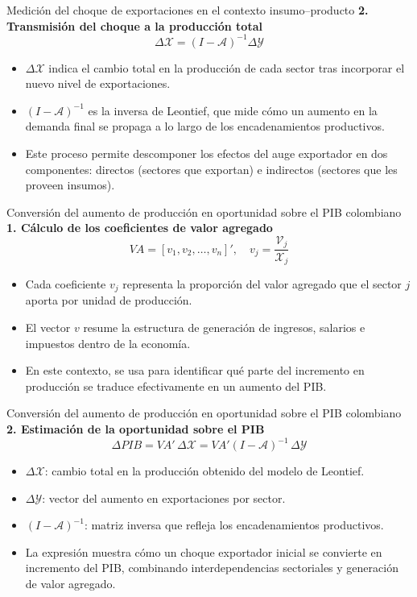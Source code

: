 \documentclass[aspectratio=169,xcolor=dvipsnames]{beamer}
\begin{document}
\begin{frame}{Medición del choque de exportaciones en el contexto insumo–producto}
    \textbf{2. Transmisión del choque a la producción total}
    \[
        \Delta \mathcal{X} = (I - \mathcal{A})^{-1} \Delta \mathcal{Y}
    \]
    \begin{itemize}
        \item $\Delta \mathcal{X}$ indica el cambio total en la producción de cada sector tras incorporar el nuevo nivel de exportaciones.
        \item $(I - \mathcal{A})^{-1}$ es la inversa de Leontief, que mide cómo un aumento en la demanda final se propaga a lo largo de los encadenamientos productivos.
        \item Este proceso permite descomponer los efectos del auge exportador en dos componentes: directos (sectores que exportan) e indirectos (sectores que les proveen insumos).
    \end{itemize}
\end{frame}

\begin{frame}{Conversión del aumento de producción en oportunidad sobre el PIB colombiano}
    \textbf{1. Cálculo de los coeficientes de valor agregado}
    \[
        VA = [v_1, v_2, \dots, v_n]' , \quad 
        v_j = \frac{\mathcal{V}_j}{\mathcal{X}_j}
    \]
    \begin{itemize}
        \item Cada coeficiente $v_j$ representa la proporción del valor agregado que el sector $j$ aporta por unidad de producción.
        \item El vector $v$ resume la estructura de generación de ingresos, salarios e impuestos dentro de la economía.
        \item En este contexto, se usa para identificar qué parte del incremento en producción se traduce efectivamente en un aumento del PIB.
    \end{itemize}
\end{frame}

\begin{frame}{Conversión del aumento de producción en oportunidad sobre el PIB colombiano}
    \textbf{2. Estimación de la oportunidad sobre el PIB}
    \[
        \Delta PIB = VA' \, \Delta \mathcal{X} = VA' (I - \mathcal{A})^{-1} \, \Delta \mathcal{Y}
    \]
    \begin{itemize}
        \item $\Delta \mathcal{X}$: cambio total en la producción obtenido del modelo de Leontief.  
        \item $\Delta \mathcal{Y}$: vector del aumento en exportaciones por sector.  
        \item $(I - \mathcal{A})^{-1}$: matriz inversa que refleja los encadenamientos productivos.  
        \item La expresión muestra cómo un choque exportador inicial se convierte en incremento del PIB, combinando interdependencias sectoriales y generación de valor agregado.
    \end{itemize}
\end{frame}
\end{document}
